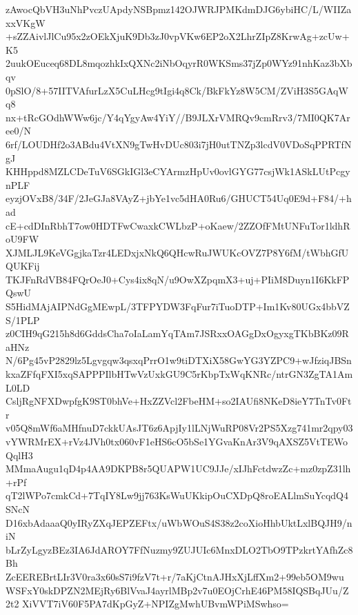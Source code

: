 zAwocQbVH3uNhPvczUApdyNSBpmz142OJWRJPMKdmDJG6ybiHC/L/WIIZaxxVKgW
+sZZAivlJlCu95x2zOEkXjuK9Db3zJ0vpVKw6EP2oX2LhrZIpZ8KrwAg+zcUw+K5
2uukOEuceq68DL8mqozhkIxQXNc2iNbOqyrR0WKSms37jZp0WYz91nhKaz3bXbqv
0pSlO/8+57IITVAfurLzX5CuLHcg9tIgi4q8Ck/BkFkYz8W5CM/ZViH3S5GAqWq8
nx+tRcGOdhWWw6jc/Y4qYgyAw4YiY//B9JLXrVMRQv9cmRrv3/7MI0QK7Aree0/N
6rf/LOUDHf2o3ABdu4VtXN9gTwHvDUc803i7jH0utTNZp3lcdV0VDoSqPPRTfNgJ
KHHppd8MZLCDeTuV6SGkIGl3eCYArmzHpUv0ovlGYG77csjWk1ASkLUtPcgynPLF
eyzjOVxB8/34F/2JeGJa8VAyZ+jbYe1vc5dHA0Ru6/GHUCT54Uq0E9d+F84/+had
cE+cdDInRbhT7ow0HDTFwCwaxkCWLbzP+oKaew/2ZZOfFMtUNFuTor1ldhRoU9FW
XJMLJL9KeVGgjkaTzr4LEDxjxNkQ6QHcwRuJWUKcOVZ7P8Y6fM/tWbhGfUQUKFij
TKJFnRdVB84FQrOeJ0+Cys4ix8qN/u9OwXZpqmX3+uj+PIiM8Duyn1I6KkFPQswU
S5HidMAjAIPNdGgMEwpL/3TFPYDW3FqFur7iTuoDTP+Im1Kv80UGx4bbVZS/1PLP
z0CIH9qG215h8d6GddsCha7oIaLamYqTAm7JSRxxOAGgDxOgyxgTKbBKz09RaHNz
N/6Pg45vP2829lz5Lgvgqw3qsxqPrrO1w9tiDTXiX58GwYG3YZPC9+wJfziqJBSn
kxaZFfqFXI5xqSAPPPIlbHTwVzUxkGU9C5rKbpTxWqKNRc/ntrGN3ZgTA1AmL0LD
CsljRgNFXDwpfgK9ST0bhVe+HxZZVcl2FbeHM+so2IAUfi8NKeD8ieY7TnTv0Ftr
v05Q8mWf6aMHfnuD7ckkUAsJT6z6ApjIy1lLNjWuRP08Vr2PS5Xzg741mr2qpy03
vYWRMrEX+rVz4JVh0tx060vF1eHS6cO5bSe1YGvaKnAr3V9qAXSZ5VtTEWoQqlH3
MMmaAugu1qD4p4AA9DKPB8r5QUAPW1UC9JJe/xIJhFctdwzZc+mz0zpZ31lh+rPf
qT2lWPo7cmkCd+7TqIY8Lw9jj763KsWuUKkipOuCXDpQ8roEALlmSuYcqdQ4SNcN
D16xbAdaaaQ0yIRyZXqJEPZEFtx/uWbWOuS4S38z2coXioHhbUktLxlBQJH9/niN
bLrZyLgyzBEz3IA6JdAROY7FfNuzmy9ZUJUIc6MnxDLO2TbO9TPzkrtYAfhZc8Bh
ZcEEREBrtLIr3V0ra3x60sS7i9fzV7t+r/7aKjCtnAJHxXjLffXm2+99eb5OM9wu
WSFxY0skDPZN2MEjRy6BlVvaJ4ayrlMBp2v7u0EOjCrhE46PM58IQSBqJUu/Z2t2
XiVVT7iV60F5PA7dKpGyZ+NPIZgMwhUBvmWPiMSwhso=
